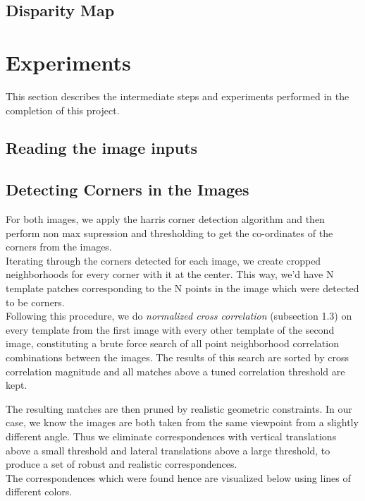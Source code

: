 \documentclass[letterpaper,11pt]{article}
\begin{document}
\subsection{Disparity Map}
  
  

\section{Experiments}
This section describes the intermediate steps and experiments
performed in the completion of this project.

\subsection{Reading the image inputs}

\subsection{Detecting Corners in the Images}
For both images, we apply the harris corner detection algorithm and then perform non max
supression and thresholding to get the co-ordinates of the corners
from the images. \\

Iterating through the corners detected for each image, we create
cropped neighborhoods for every corner with it at the center.
This way, we'd have N template patches corresponding to the N points
in the image which were detected to be corners. \\

Following this procedure, we do \textit{normalized cross correlation}
(subsection 1.3) on every template from the first image with every
other template of the second image, constituting a brute force search
of all point neighborhood correlation combinations between the
images. The results of this search are sorted by cross correlation
magnitude and all matches above a tuned correlation threshold are
kept.

The resulting matches are then pruned by realistic geometric
constraints. In our case, we know the images are both taken from the
same viewpoint from a slightly different angle. Thus we eliminate
correspondences with vertical translations above a small threshold and
lateral translations above a large threshold, to produce a set of
robust and realistic correspondences.\\


The correspondences which were found hence are visualized below using lines of different
colors.
\end{document}
